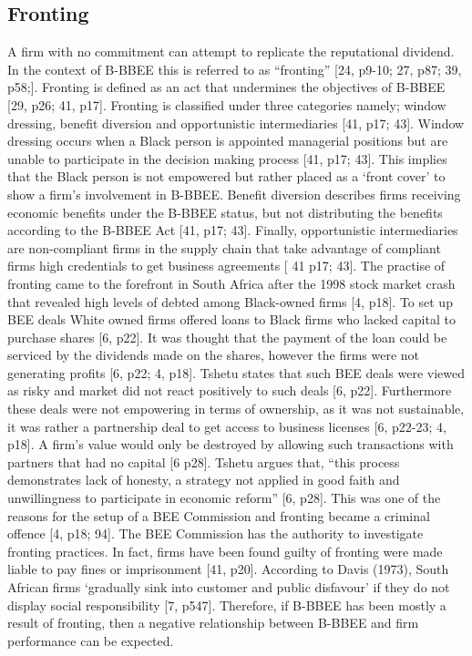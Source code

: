 \subsection{Fronting}
A firm with no commitment can attempt to replicate the reputational dividend. In the context of B-BBEE this is referred to as “fronting” [24, p9-10; 27, p87; 39, p58;]. Fronting is defined as an act that undermines the objectives of B-BBEE [29, p26; 41, p17]. Fronting is classified under three categories namely; window dressing, benefit diversion and opportunistic intermediaries [41, p17; 43]. Window dressing occurs when a Black person is appointed managerial positions but are unable to participate in the decision making process [41, p17; 43]. This implies that the Black person is not empowered but rather placed as a ‘front cover’ to show a firm's involvement in B-BBEE. Benefit diversion describes firms receiving economic benefits under the B-BBEE status, but not distributing the benefits according to the B-BBEE Act [41, p17; 43]. Finally, opportunistic intermediaries are non-compliant firms in the supply chain that take advantage of compliant firms high credentials to get business agreements [ 41 p17; 43].  The practise of fronting came to the forefront in South Africa after the 1998 stock market crash that revealed high levels of debted among Black-owned firms [4, p18]. To set up BEE deals White owned firms offered loans to Black firms who lacked capital to purchase shares [6, p22]. It was thought that the payment of the loan could be serviced by the dividends made on the shares, however the firms were not generating profits [6, p22; 4, p18]. Tshetu states that such BEE deals were viewed as risky and market did not react positively to such deals [6, p22]. Furthermore these deals were not empowering in terms of ownership, as it was not sustainable, it was rather a partnership deal to get access to business licenses [6, p22-23; 4, p18]. A firm’s value would only be destroyed by allowing such transactions with partners that had no capital [6 p28]. Tshetu argues that, “this process demonstrates lack of honesty, a strategy not applied in good faith and unwillingness to participate in economic reform” [6, p28]. This was one of the reasons for the setup of a BEE Commission and fronting became a criminal offence [4, p18; 94]. The BEE Commission has the authority to investigate fronting practices. In fact, firms have been found guilty of fronting were made liable to pay fines or imprisonment [41, p20]. According to Davis (1973), South African firms ‘gradually sink into customer and public disfavour’ if they do not display social responsibility [7, p547]. Therefore, if B-BBEE has been mostly a result of fronting, then a negative relationship between B-BBEE and firm performance can be expected.
